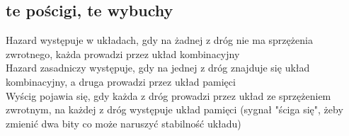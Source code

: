\subsection{te pościgi, te wybuchy}
\indent\indent Hazard występuje w układach, gdy na żadnej z dróg nie ma sprzężenia zwrotnego, każda prowadzi przez układ kombinacyjny\\
\indent Hazard zasadniczy występuje, gdy na jednej z dróg znajduje się układ kombinacyjny, a druga prowadzi przez układ pamięci\\
\indent Wyścig pojawia się, gdy każda z dróg prowadzi przez układ ze sprzężeniem zwrotnym, na każdej z dróg występuje układ pamięci (sygnał "ściga się", żeby zmienić dwa bity co może naruszyć stabilność układu)\\